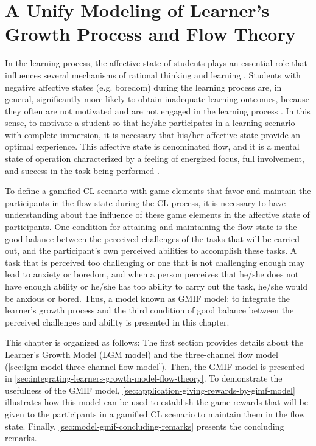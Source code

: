\chapter[A Unify Modeling of Learner's Growth Process and Flow Theory]{A Unify Modeling of Learner's Growth Process and Flow Theory}
\label{chapter:unify-modeling-learner-growth-flow-theory}

In the learning process, the affective state of students plays an essential role that influences several mechanisms of rational thinking and learning \cite{D'Mello2012, Picard2000, ReisRodriguezLyraJaquesBittencourtIsotani2015}. Students with negative affective states (e.g. boredom) during the learning process are, in general, significantly more likely to obtain inadequate learning outcomes, because they often are not motivated and are not engaged in the learning process \cite{CraigGraesserSullinsGholson2004, ShernoffCsikszentmihalyiSchneiderShernoff2014}. In this sense, to motivate a student so that he/she participates in a learning scenario with complete immersion, it is necessary that his/her affective state provide an optimal experience. This affective state is denominated flow, and it is a mental state of operation characterized by a feeling of energized focus, full involvement, and success in the task being performed \cite{Csikszentmihalyi2008}. 

To define a gamified CL scenario with game elements that favor and maintain the participants in the flow state during the CL process, it is necessary to have understanding about the influence of these game elements in the affective state of participants. One condition for attaining and maintaining the flow state is the good balance between the perceived challenges of the tasks that will be carried out, and the participant’s own perceived abilities to accomplish these tasks. A task that is perceived too challenging or one that is not challenging enough may lead to anxiety or boredom, and when a person perceives that he/she does not have enough ability or he/she has too ability to carry out the task, he/she would be anxious or bored. Thus, a model known as GMIF model:  to integrate the learner's growth process and the third condition of good balance between the perceived challenges and ability is presented in this chapter. 

This chapter is organized as follows: The first section provides details about the Learner’s Growth Model (LGM model) and the three-channel flow model (\autoref{sec:lgm-model-three-channel-flow-model}). Then, the GMIF model is presented in \autoref{sec:integrating-learners-growth-model-flow-theory}. To demonstrate the usefulness of the GMIF model, \autoref{sec:application-giving-rewards-by-gimf-model} illustrates how this model can be used to establish the game rewards that will be given to the participants in a gamified CL scenario to maintain them in the flow state. Finally, \autoref{sec:model-gmif-concluding-remarks} presents the concluding remarks.

